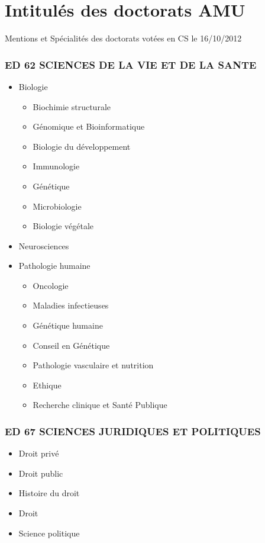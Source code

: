 \section{Intitulés des doctorats AMU}

Mentions et Spécialités des doctorats votées en CS le 16/10/2012

\subsubsection*{ED 62 SCIENCES DE LA VIE ET DE LA SANTE}\label{ed-62-sciences-de-la-vie-et-de-la-sante}

\begin{itemize}
\item
Biologie
\begin{itemize}
\item Biochimie structurale
\item Génomique et Bioinformatique
\item Biologie du développement
\item Immunologie
\item Génétique
\item Microbiologie\
\item Biologie végétale
\end{itemize}
\item
Neurosciences
\item
Pathologie humaine
\begin{itemize}
\item Oncologie
\item Maladies infectieuses
\item Génétique humaine
\item Conseil en Génétique
\item Pathologie vasculaire et nutrition
\item Ethique
\item Recherche clinique et Santé Publique
\end{itemize}
\end{itemize}

\subsubsection*{ED 67 SCIENCES JURIDIQUES ET POLITIQUES}\label{ed-67-sciences-juridiques-et-politiques}

\begin{itemize}
\item
  Droit privé
\item
  Droit public
\item
  Histoire du droit
\item
  Droit
\item
  Science politique
\end{itemize}

